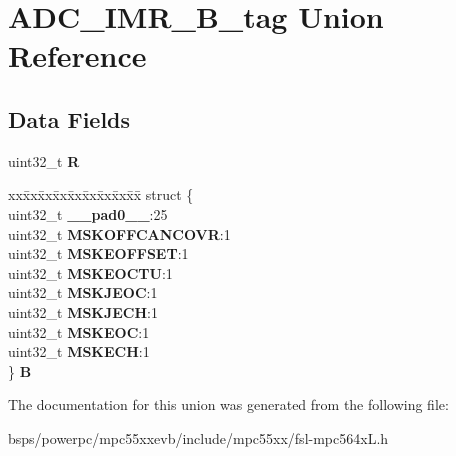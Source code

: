 \hypertarget{unionADC__IMR__32B__tag}{}\section{A\+D\+C\+\_\+\+I\+M\+R\+\_\+B\+\_\+tag Union Reference}
\label{unionADC__IMR__32B__tag}
\subsection*{Data Fields}
\begin{DoxyCompactItemize}
\item 
\mbox{\label{unionADC__IMR__32B__tag_a9927d7c53ab1c54f3becd5f79ecd3b8b}} 
uint32\+\_\+t {\bfseries R}
\item 
\mbox{\label{unionADC__IMR__32B__tag_a07ddd30928fa20ea8f9138ee7157805d}} 
\begin{tabbing}
xx\=xx\=xx\=xx\=xx\=xx\=xx\=xx\=xx\=\kill
struct \{\\
\>uint32\_t {\bfseries \_\_pad0\_\_}:25\\
\>uint32\_t {\bfseries MSKOFFCANCOVR}:1\\
\>uint32\_t {\bfseries MSKEOFFSET}:1\\
\>uint32\_t {\bfseries MSKEOCTU}:1\\
\>uint32\_t {\bfseries MSKJEOC}:1\\
\>uint32\_t {\bfseries MSKJECH}:1\\
\>uint32\_t {\bfseries MSKEOC}:1\\
\>uint32\_t {\bfseries MSKECH}:1\\
\} {\bfseries B}\\

\end{tabbing}\end{DoxyCompactItemize}


The documentation for this union was generated from the following file\+:\begin{DoxyCompactItemize}
\item 
bsps/powerpc/mpc55xxevb/include/mpc55xx/fsl-\/mpc564x\+L.\+h\end{DoxyCompactItemize}
